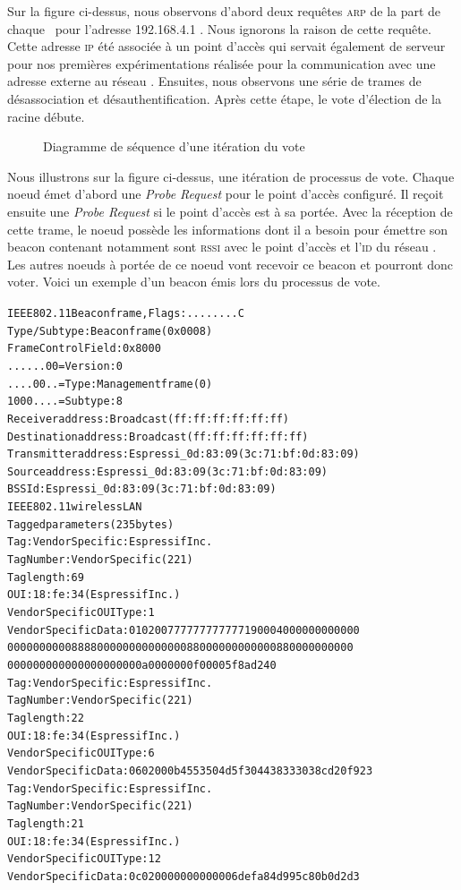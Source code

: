             Sur la figure ci-dessus, nous observons d'abord deux requêtes \textsc{arp} de la part de chaque \esp\ pour l'adresse
            192.168.4.1 . Nous ignorons la raison de cette requête. Cette adresse \textsc{ip} été associée à un point d'accès
            qui servait également de serveur pour nos premières expérimentations réalisée pour la communication avec une adresse
            externe au réseau \espmesh. Ensuites, nous observons une série de trames de désassociation et désauthentification.
            Après cette étape, le vote d'élection de la racine débute.
            \begin{figure}[H]
                \caption{Diagramme de séquence d'une itération du vote}        
            \end{figure}
            Nous illustrons sur la figure ci-dessus, une itération de processus de vote.
            Chaque noeud émet d'abord une \textit{Probe Request} pour le point d'accès configuré. Il reçoit ensuite
            une \textit{Probe Request} si le point d'accès est à sa portée. Avec la réception de cette trame,
            le noeud possède les informations dont il a besoin pour émettre son beacon contenant notamment
            sont \textsc{rssi} avec le point d'accès et l'\textsc{id} du réseau \espmesh. Les autres noeuds
            à portée de ce noeud vont recevoir ce beacon et pourront donc voter. Voici un exemple
            d'un beacon émis lors du processus de vote.
            \begin{alltt}
IEEE 802.11 Beacon frame, Flags: ........C
    Type/Subtype: Beacon frame (0x0008)
    Frame Control Field: 0x8000
        .... ..00 = Version: 0
        .... 00.. = Type: Management frame (0)
        1000 .... = Subtype: 8
    Receiver address: Broadcast (ff:ff:ff:ff:ff:ff)
    Destination address: Broadcast (ff:ff:ff:ff:ff:ff)
    Transmitter address: Espressi_0d:83:09 (3c:71:bf:0d:83:09)
    Source address: Espressi_0d:83:09 (3c:71:bf:0d:83:09)
    BSS Id: Espressi_0d:83:09 (3c:71:bf:0d:83:09)
IEEE 802.11 wireless LAN
    Tagged parameters (235 bytes)
        Tag: Vendor Specific: Espressif Inc.
            Tag Number: Vendor Specific (221)
            Tag length: 69
            OUI: 18:fe:34 (Espressif Inc.)
            Vendor Specific OUI Type: 1
            Vendor Specific Data: 010200777777777777190004000000000000
                000000000088880000000000000088000000000000880000000000
                000000000000000000000a0000000f00005f8ad240
        Tag: Vendor Specific: Espressif Inc.
            Tag Number: Vendor Specific (221)
            Tag length: 22
            OUI: 18:fe:34 (Espressif Inc.)
            Vendor Specific OUI Type: 6
            Vendor Specific Data: 0602000b4553504d5f304438333038cd20f923
        Tag: Vendor Specific: Espressif Inc.
            Tag Number: Vendor Specific (221)
            Tag length: 21
            OUI: 18:fe:34 (Espressif Inc.)
            Vendor Specific OUI Type: 12
            Vendor Specific Data: 0c020000000000006defa84d995c80b0d2d3
            \end{alltt}

